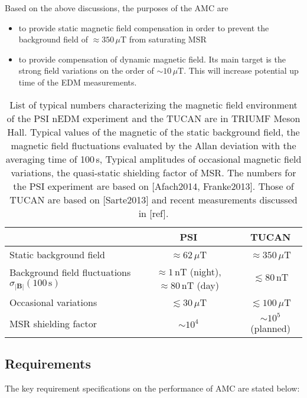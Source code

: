 Based on the above discussions, the purposes of the AMC are 
\begin{itemize}
    \item to provide static magnetic field compensation in order to prevent the background field of $\approx 350\,\mu$T from saturating MSR 
    \item to provide compensation of dynamic magnetic field. Its main target is the strong field variations on the order of $\sim 10\,\mu$T. This will increase potential up time of the EDM measurements. 
\end{itemize}

\begin{table}[hbt]
\centering 
\begin{tabular}{|l||c|c|}
\hline

 & \multicolumn{1}{c|}{\textbf{PSI}} & \multicolumn{1}{c|}{\textbf{TUCAN}} \\ \hline\hline 
Static background field  & $\approx62\,\mu$T & $\approx 350\,\mu$T                       \\ \hline
Background field fluctuations  $\sigma_{|\mathbf{B}|}(100\,\mathrm{s})$ & $\approx 1\,\mathrm{nT}$ (night), $\approx 80\,\mathrm{nT}$ (day) & $\lesssim 80\,\mathrm{nT}$ \\ \hline
Occasional variations    & $\lesssim30\,\mu$T   & $\lesssim 100\,\mu$T            \\ \hline
 MSR shielding  factor       &    $\sim 10^4$   &   $\sim 10^5$ (planned)  \\ \hline 
\end{tabular}
\caption{List of typical numbers characterizing the magnetic field environment of the PSI nEDM experiment and the TUCAN are in TRIUMF Meson Hall. Typical values of the magnetic of the static background field, the magnetic field fluctuations evaluated by the Allan deviation with the averaging time of 100\,s, Typical amplitudes of occasional magnetic field variations, the quasi-static shielding factor of MSR. The numbers for the PSI experiment are based on [Afach2014, Franke2013]. Those of TUCAN are based on [Sarte2013] and recent measurements discussed in [ref]. 
}
\label{tab:amc_comparaion}
\end{table}


\subsection{Requirements}
The key requirement specifications on the performance of AMC are stated below:


